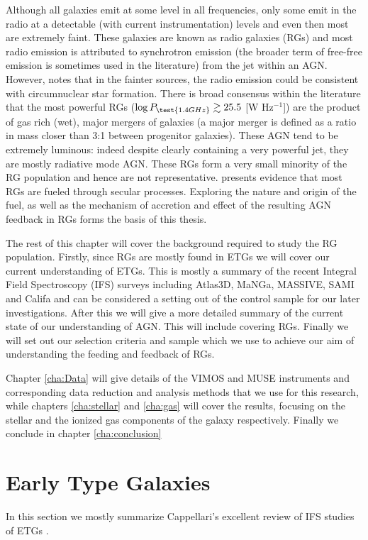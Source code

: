 Although all galaxies emit at some level in all frequencies, only some emit in the radio at a detectable (with current instrumentation) levels and even then most are extremely faint. These galaxies are known as radio galaxies (RGs) and most radio emission is attributed to synchrotron emission (the broader term of free-free emission is sometimes used in the literature) from the jet within an AGN. However, \citet{Nyland2016} notes that in the fainter sources, the radio emission could be consistent with circumnuclear star formation. There is broad consensus within the literature that the most powerful RGs ($\log P_\test{1.4 GHz} \gtrsim 25.5$ [W Hz$^{-1}$]) are the product of gas rich (wet), major mergers of galaxies (a major merger is defined as a ratio in mass closer than 3:1 between progenitor galaxies). These AGN tend to be extremely luminous: indeed despite clearly containing a very powerful jet, they are mostly radiative mode AGN. These RGs form a very small minority of the RG population and hence are not representative. \citet{Heckman2014} presents evidence that most RGs are fueled through secular processes. Exploring the nature and origin of the fuel, as well as the mechanism of accretion and effect of the resulting AGN feedback in RGs forms the basis of this thesis. 

The rest of this chapter will cover the background required to study the RG population. Firstly, since RGs are mostly found in ETGs we will cover our current understanding of ETGs. This is mostly a summary of the recent Integral Field Spectroscopy (IFS) surveys including Atlas3D, MaNGa, MASSIVE, SAMI and Califa and can be considered a setting out of the control sample for our later investigations. After this we will give a more detailed summary of the current state of our understanding of AGN. This will include covering RGs. Finally we will set out our selection criteria and sample which we use to achieve our aim of understanding the feeding and feedback of RGs.

Chapter \ref{cha:Data} will give details of the VIMOS and MUSE instruments and corresponding data reduction and analysis methods that we use for this research, while chapters \ref{cha:stellar} and \ref{cha:gas} will cover the results, focusing on the stellar and the ionized gas components of the galaxy respectively. Finally we conclude in chapter \ref{cha:conclusion}

\section{Early Type Galaxies}
	\label{sec:ETG}
	In this section we mostly summarize Cappellari's excellent review of IFS studies of ETGs \citep{Cappellari2016}. 

